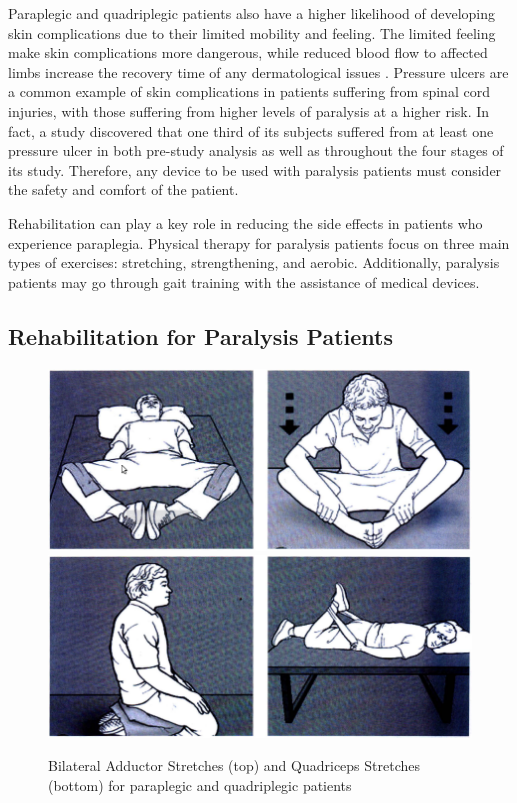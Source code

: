 Paraplegic and quadriplegic patients also have a higher likelihood of developing skin complications due to their limited mobility and feeling. The limited feeling make skin complications more dangerous, while reduced blood flow to affected limbs increase the recovery time of any dermatological issues \cite{SPISecondaryEffects}. Pressure ulcers are a common example of skin complications in patients suffering from spinal cord injuries, with those suffering from higher levels of paralysis at a higher risk. In fact, a study \cite{PressureUlcerRiskParalysis} discovered that one third of its subjects suffered from at least one pressure ulcer in both pre-study analysis as well as throughout the four stages of its study. Therefore, any device to be used with paralysis patients must consider the safety and comfort of the patient.

Rehabilitation can play a key role in reducing the side effects in patients who experience paraplegia. Physical therapy for paralysis patients focus on three main types of exercises: stretching, strengthening, and aerobic. Additionally, paralysis patients may go through gait training with the assistance of medical devices.

\subsection{Rehabilitation for Paralysis Patients}

\begin{figure}[ht!]
    \includegraphics[width=\linewidth]{Figures/Background/BilateralAdductorStretch.png}
    \includegraphics[width=\linewidth]{Figures/Background/QuadricepsStretch.png}
    \caption{Bilateral Adductor Stretches (top) and Quadriceps Stretches (bottom) for paraplegic and quadriplegic patients \cite{RehabParaplegia}}
    \label{fig:ParaplegiaStretches}
\end{figure}

